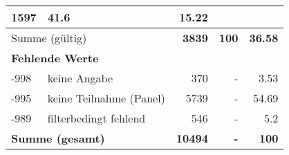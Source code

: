 \begin{longtable}{lXrrr}
       \num{1597} &
       \num[round-mode=places,round-precision=2]{41,6} &
         \num[round-mode=places,round-precision=2]{15,22} \\
     \midrule
     \multicolumn{2}{l}{Summe (gültig)} &
       \textbf{\num{3839}} &
     \textbf{100} &
       \textbf{\num[round-mode=places,round-precision=2]{36,58}} \\
     \multicolumn{5}{l}{\textbf{Fehlende Werte}}\\
       -998 &
       keine Angabe &
         \num{370} &
        - &
         \num[round-mode=places,round-precision=2]{3,53} \\
       -995 &
       keine Teilnahme (Panel) &
         \num{5739} &
        - &
         \num[round-mode=places,round-precision=2]{54,69} \\
       -989 &
       filterbedingt fehlend &
         \num{546} &
        - &
         \num[round-mode=places,round-precision=2]{5,2} \\
     \midrule
     \multicolumn{2}{l}{\textbf{Summe (gesamt)}} &
          \textbf{\num{10494}} &
        \textbf{-} &
        \textbf{100} \\
     \bottomrule
     \end{longtable}
     
